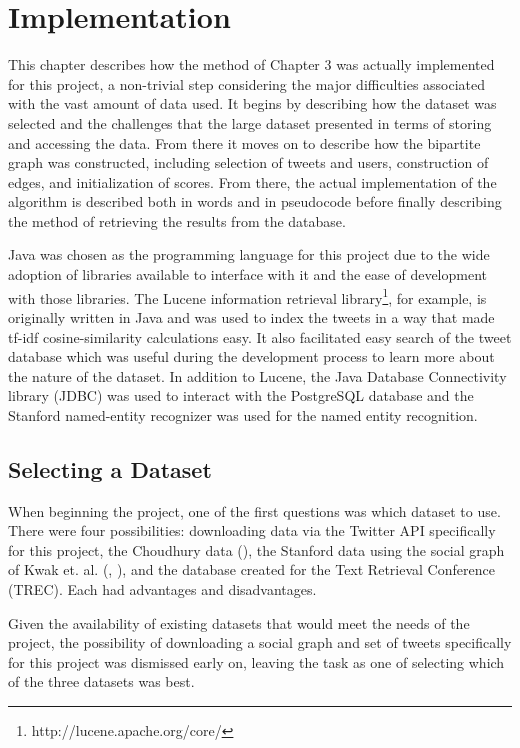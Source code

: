 \chapter{Implementation}

This chapter describes how the method of Chapter 3 was actually implemented for this project, a non-trivial step considering the major difficulties associated with the vast amount of data used. It begins by describing how the dataset was selected and the challenges that the large dataset presented in terms of storing and accessing the data. From there it moves on to describe how the bipartite graph was constructed, including selection of tweets and users, construction of edges,  and initialization of scores. From there, the actual implementation of the algorithm is described both in words and in pseudocode before finally describing the method of retrieving the results from the database.

Java was chosen as the programming language for this project due to the wide adoption of libraries available to interface with it and the ease of development with those libraries. The Lucene information retrieval library\footnote{http://lucene.apache.org/core/}, for example, is originally written in Java and was used to index the tweets in a way that made tf-idf cosine-similarity calculations easy. It also facilitated easy search of the tweet database which was useful during the development process to learn more about the nature of the dataset. In addition to Lucene, the Java Database Connectivity library (JDBC) was used to interact with the PostgreSQL database and the Stanford named-entity recognizer was used for the named entity recognition.

\section{Selecting a Dataset}
\label{sec:SelectingADataset}


When beginning the project, one of the first questions was which dataset to use. There were four possibilities: downloading data via the Twitter API specifically for this project, the Choudhury data (\cite{Choudhury2010}), the Stanford data using the social graph of Kwak et. al. (\cite{Yang2011}, \cite{Kwak2010}), and the database created for the Text Retrieval Conference (TREC). Each had advantages and disadvantages.

Given the availability of existing datasets that would meet the needs of the project, the possibility of downloading a social graph and set of tweets specifically for this project was dismissed early on, leaving the task as one of selecting which of the three datasets was best.

